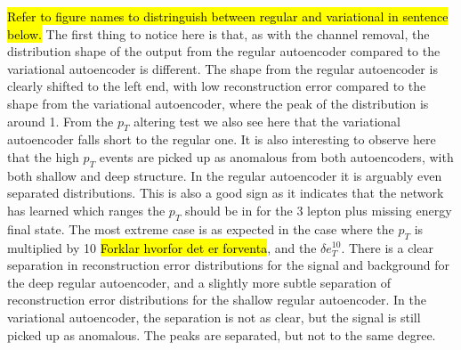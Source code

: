\hl{Refer to figure names to distringuish between regular and variational in sentence below.}
The first thing to notice here is that, as with the channel removal, the distribution shape of the output from the regular autoencoder compared to the
variational autoencoder is different. The shape from the regular autoencoder is clearly shifted to the left end, with low reconstruction error compared 
to the shape from the variational autoencoder, where the peak of the distribution is around 1. From the $p_T$ altering test we also see here that the 
variational autoencoder falls short to the regular one. It is also interesting to observe here that the high $p_T$ events are picked up as anomalous from both
autoencoders, with both shallow and deep structure. In the regular autoencoder it is arguably even separated distributions. This is also a good sign as it 
indicates that the network has learned which ranges the $p_T$ should be in for the 3 lepton plus missing energy final state. The most extreme case is 
as expected in the case where the $p_T$ is multiplied by 10 \hl{Forklar hvorfor det er forventa}, and the $\delta e_T^{10}$. There is a clear separation in reconstruction error distributions for the
signal and background for the deep regular autoencoder, and a slightly more subtle separation of reconstruction error distributions for the shallow regular autoencoder.
In the variational autoencoder, the separation is not as clear, but the signal is still picked up as anomalous. The peaks are separated, but not to the same degree. 

